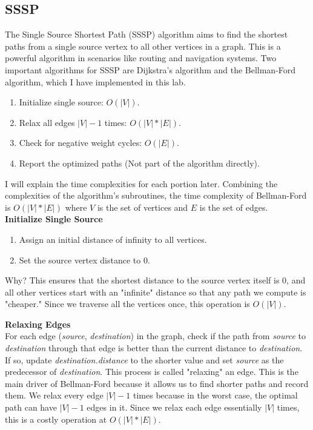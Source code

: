 \documentclass[letterpaper, 10pt]{article}
\begin{document}
\subsection{SSSP}
The Single Source Shortest Path (SSSP) algorithm aims to find the shortest paths from a single source vertex to all other vertices in a graph. This is a powerful algorithm in scenarios like routing and navigation systems. Two important algorithms for SSSP are Dijkstra's algorithm and the Bellman-Ford algorithm, which I have implemented in this lab.
\begin{enumerate}
    \item Initialize single source: $O(|V|)$.
    \item Relax all edges $|V| - 1$ times: $O(|V| * |E|)$.
    \item Check for negative weight cycles: $O(|E|)$.
    \item Report the optimized paths (Not part of the algorithm directly).
\end{enumerate}
I will explain the time complexities for each portion later. Combining the complexities of the algorithm's subroutines, the time complexity of Bellman-Ford is $O(|V| * |E|)$ where $V$ is the set of vertices and $E$ is the set of edges. \\
\noindent \newline
\textbf{Initialize Single Source}
\begin{enumerate}
    \item Assign an initial distance of infinity to all vertices.
    \item Set the source vertex distance to 0.

\end{enumerate}
Why? This ensures that the shortest distance to the source vertex itself is 0, and all other vertices start with an "infinite" distance so that any path we compute is "cheaper." Since we traverse all the vertices once, this operation is $O(|V|)$.

\newpage
\noindent
\textbf{Relaxing Edges} \\
\indent For each edge (\textit{source}, \textit{destination}) in the graph, check if the path from \textit{source} to \textit{destination} through that edge is better than the current distance to \textit{destination}. If so, update \textit{destination.distance} to the shorter value and set \textit{source} as the predecessor of \textit{destination}. \newline
This process is called "relaxing" an edge. This is the main driver of Bellman-Ford because it allows us to find shorter paths and record them. We relax every edge $|V| - 1$ times because in the worst case, the optimal path can have $|V| - 1$ edges in it. Since we relax each edge essentially $|V|$ times, this is a costly operation at $O(|V| * |E|)$.
\end{document}
